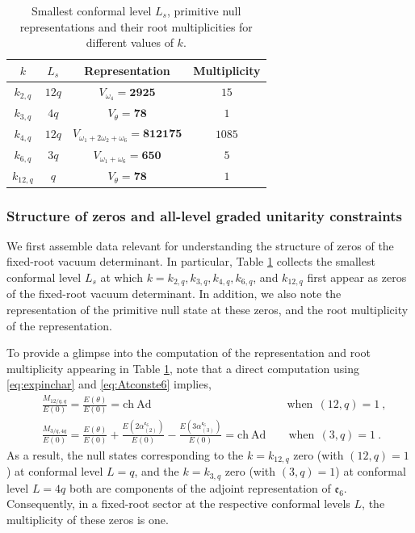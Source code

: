 \begin{table}[] 
    \centering
    \begin{tabular}{|c|c|c|c|}
        \hline\hline
        $k$ & $L_s$ & Representation & Multiplicity \\
        \hline\hline
        $k_{2,q}$  & $12q$ & $V_{\omega_4} = \textbf{2925}$ & $15$ \\
        $k_{3,q}$  & $4q$  & $V_\theta = \textbf{78}$ & $1$ \\
        $k_{4,q}$  & $12q$ & $V_{\omega_1+2\omega_2 + \omega_6} = \textbf{812175}$ & $1085$ \\
        $k_{6,q}$  & $3q$  & $V_{\omega_1 + \omega_6} = \textbf{650}$ & $5$ \\
        $k_{12,q}$ & $q$   & $V_\theta = \textbf{78}$ & $1$ \\
        \hline
    \end{tabular}
    \caption{\label{tb:e6zerodata} Smallest conformal level $L_s$, primitive null representations and their root multiplicities for different values of $k$.}
\end{table}
\subsubsection{Structure of zeros and all-level graded unitarity constraints}
We first assemble data relevant for understanding the structure of zeros of the fixed-root vacuum determinant. In particular, Table \ref{tb:e6zerodata} collects the smallest conformal level $L_s$ at which $k = k_{2,q}, k_{3,q}, k_{4,q}, k_{6,q}$, and $k_{12,q}$ first appear as zeros of the fixed-root vacuum determinant. In addition, we also note the representation of the primitive null state at these zeros, and the root multiplicity of the representation. 

To provide a glimpse into the computation of the representation and root multiplicity appearing in Table \ref{tb:e6zerodata}, note that a direct computation using \eqref{eq:expinchar} and \eqref{eq:Atconste6} implies,
\begin{equation} \label{eq:multrelevante6}
\begin{split}
    &\frac{M_{12/q,q}}{E(0)} = \frac{E(\theta)}{E(0)} = \text{ch}~\text{Ad} \qquad \qquad \qquad \qquad \qquad \qquad \text{when} \ \ (12,q) = 1~, \\
    &\frac{M_{3/q,4q}}{E(0)} = \frac{E(\theta)}{E(0)} + \frac{E(2\alpha^{\mathfrak{e}_6}_{(2)})}{E(0)} -\frac{E(3\alpha^{\mathfrak{e}_6}_{(3)})}{E(0)}= \text{ch}~\text{Ad} \qquad \text{when} \ \ (3,q) = 1~.
\end{split}
\end{equation}
As a result, the null states corresponding to the $k = k_{12,q}$ zero (with $(12,q) = 1$) at conformal level $L = q$, and the $k = k_{3,q}$ zero (with $(3,q) = 1$) at conformal level $L = 4q$ both are components of the adjoint representation of $\mathfrak{e}_6$. Consequently, in a fixed-root sector at the respective conformal levels $L$, the multiplicity of these zeros is one.

